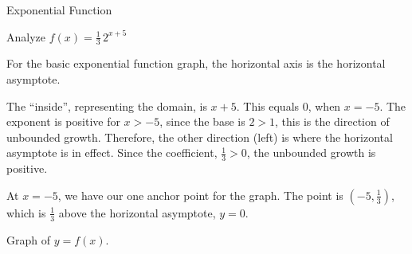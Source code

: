\documentclass{ximera}
\begin{document}
\begin{example}  Exponential Function



Analyze   $f(x) = \frac{1}{3} \, 2^{x+5}$ \\


\begin{explanation}

For the basic exponential function graph, the horizontal axis is the horizontal asymptote.  



The ``inside'', representing the domain, is $x+5$.  This equals $0$, when $x=-5$.  The exponent is positive for $x>-5$, since the base is $2 > 1$, this is the direction of unbounded growth.  Therefore, the other direction (left) is where the horizontal asymptote is in effect.  Since the coefficient, $\frac{1}{3} > 0$, the unbounded growth is positive.

At $x=-5$, we have our one anchor point for the graph.  The point is $\left(-5, \frac{1}{3} \right)$, which is $\frac{1}{3}$ above the horizontal asymptote, $y = 0$.


Graph of $y = f(x)$.

\begin{image}
\end{image}





\end{explanation}
\end{example}
\end{document}
